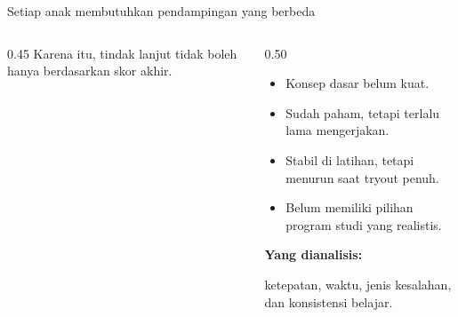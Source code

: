 \begin{frame}{Setiap anak membutuhkan pendampingan yang berbeda}
  \begin{columns}[T,onlytextwidth]
    \begin{column}{0.45\textwidth}
      \vspace{0.26cm}
      {\color{StudentGray}\fontsize{12}{15}\selectfont Karena itu, tindak lanjut tidak boleh hanya berdasarkan skor akhir.}
    \end{column}
    \begin{column}{0.50\textwidth}
      \begin{itemize}
        \item Konsep dasar belum kuat.
        \item Sudah paham, tetapi terlalu lama mengerjakan.
        \item Stabil di latihan, tetapi menurun saat tryout penuh.
        \item Belum memiliki pilihan program studi yang realistis.
      \end{itemize}
      \vspace{0.10cm}
      {\color{StudentBlue}\bfseries\fontsize{11}{13.5}\selectfont Yang dianalisis:}\par
      {\fontsize{10.8}{13.5}\selectfont ketepatan, waktu, jenis kesalahan, dan konsistensi belajar.}
    \end{column}
  \end{columns}
\end{frame}

